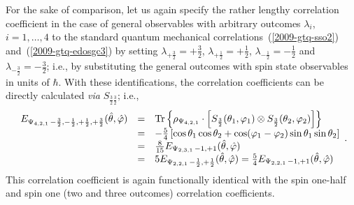 \documentclass[fleqn,twoside]{article}      %
\begin{document}
For the sake of comparison, let us again specify the rather lengthy
correlation coefficient in the case of general observables with arbitrary outcomes $\lambda_i$, $i=1,\ldots ,4$
to the standard  quantum mechanical correlations~(\ref{2009-gtq-sso2})
and~(\ref{2009-gtq-edosgc3})
by setting $\lambda_{+\frac{3}{2}} = +\frac{3}{2}$,
$\lambda_{+\frac{1}{2}}= +\frac{1}{2}$,
$\lambda_{-\frac{1}{2}}=-\frac{1}{2}$ and
$\lambda_{-\frac{3}{2}}=-\frac{3}{2}$; i.e., by substituting the general outcomes with spin state observables in units of $\hbar$.
With these identifications, the correlation coefficients can be directly calculated {\it via} $S_{\frac{3}{2}\frac{3}{2}}$; i.e.,
\begin{equation}
\begin{array}{rcl}
E_{{ \Psi_{4,2,1}}\,-\frac{3}{2},-\frac{1}{2}, +\frac{1}{2}, +\frac{3}{2} } ({\hat \theta},{\hat \varphi} )
&=&
{\rm Tr}\left\{ \rho_{ \Psi_{4,2,1}} \cdot \left[ S_{\frac{3}{2}}(\theta_1,\varphi_1) \otimes S_{\frac{3}{2}}(\theta_2,\varphi_2)\right]\right\} \\
&=& -\frac{5}{4} \left[\cos \theta_1 \cos \theta_2 + \cos (\varphi_1 - \varphi_2) \sin \theta_1 \sin \theta_2\right] \\
&=& \frac{8}{15}E_{{ \Psi_{2,3,1}}\,-1, +1 } ({\hat \theta},{\hat \varphi} ) \\
&=& 5 E_{{ \Psi_{2,2,1}}\,-\frac{1}{2}, +\frac{1}{2} } ({\hat \theta},{\hat \varphi} )
= \frac{5}{4}E_{{ \Psi_{2,2,1}}\,-1, +1 } ({\hat \theta},{\hat \varphi} )
\end{array}
\label{2009-gtq-edosgc4}
.
\end{equation}
This correlation coefficient is again functionally identical with the spin one-half and spin one (two and three outcomes) correlation coefficients.
\end{document}
